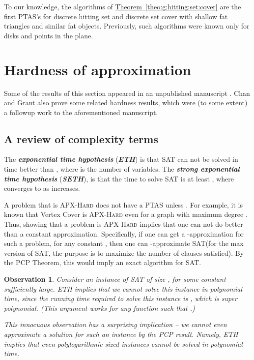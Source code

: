 \documentclass[12pt]{article}
\newcommand{\Term}[1]{\textsf{#1}}
\newcommand{\emphic}[2]{\textcolor{blue25}{\textbf{\emph{#1}}}\index{#2}}
\renewcommand{\emphic}[2]{\textbf{\emph{#1}}}
\newcommand{\emphi}[1]{\emphic{#1}{#1}}
\newtheorem{observation}[theorem]{Observation}
\theoremstyle{remark}\theoremheaderfont{\sf}\theorembodyfont{\upshape}
\numberwithin{figure}{section}\numberwithin{table}{section}\numberwithin{equation}{section}
\newcommand{\HLink}[2]{\hyperref[#2]{#1~\ref*{#2}}}
\newcommand{\HLinkPage}[2]{\hyperref[#2]{#1~\ref*{#2}}}
\newcommand{\seclab}[1]{\label{sec:#1}} \newcommand{\secref}[1]{\HLink{Section}{sec:#1}} \newcommand{\secrefpage}[1]{\HLinkPage{Section}{sec:#1}}
\newcommand{\obslab}[1]{\label{observation:#1}}
\newcommand{\thmref}[1]{\HLink{Theorem}{theo:#1}}
\newcommand{\ETH}{\Term{ETH}\xspace}
\newcommand{\SETH}{\Term{SETH}\xspace}
\newcommand{\TrSAT}{\ProblemC{SAT}\xspace}
\newcommand{\kSAT}{\ProblemC{SAT}\xspace}
\newcommand{\ProblemC}[1]{\textsf{#1}}
\providecommand{\ComplexityClass}[1]{{{\textcolor[named]{ColorComplexityClass}{\textsc{#1}}}}}
\newcommand{\PTAS}{\Term{PTAS}\xspace}
\newcommand{\APXHard}{\ComplexityClass{APX-Hard}\xspace}
\begin{document}
\begin{remark}
  To our knowledge, the algorithms of \thmref{g:hitting:set:cover} are
  the first \PTAS's for discrete hitting set and discrete set cover
  with shallow fat triangles and similar fat objects. Previously, such
  algorithms were known only for disks and points in the plane.
\end{remark}






\section{Hardness of approximation}
\seclab{hardness}

Some of the results of this section appeared in an unpublished
manuscript \cite{h-bffne-09}.  Chan and Grant \cite{cg-eaahr-14} also
prove some related hardness results, which were (to some extent) a
followup work to the aforementioned manuscript.

\subsection{A review of complexity terms} \seclab{complexity}


The \emphi{exponential time hypothesis} (\emphi{\ETH})
\cite{ip-ocks-01, ipz-wphse-01} is that \TrSAT can not be solved in
time better than , where  is the number of
variables. The \emphi{strong exponential time hypothesis}
(\emphi{\SETH}), is that the time to solve \kSAT is at least
, where  converges to  as  increases.

A problem that is \APXHard does not have a \PTAS unless
.  For example, it is known that \ProblemC{Vertex Cover}
is \APXHard even for a graph with maximum degree 
\cite{acgkm-ca-99}.  Thus, showing that a problem is \APXHard implies
that one can not do better than a constant
approximation. Specifically, if one can get a -approximation
for such a problem, for any constant , then one can
-approximate \TrSAT (for the max version of \TrSAT, the
purpose is to maximize the number of clauses satisfied). By the
\Term{PCP} Theorem, this would imply an exact algorithm for \TrSAT.


\begin{observation}\obslab{eth:no:a}Consider an instance of \TrSAT of size , for some
  constant  sufficiently large. \ETH implies that we cannot
  solve this instance in polynomial time, since the running time
  required to solve this instance is , which is super
  polynomial. (This argument works for any function  such that
  .)

  This innocuous observation has a surprising implication -- we cannot
  even  approximate a solution for such an instance by the
  \Term{PCP} result. Namely, \ETH implies that even polylogarithmic
  sized instances cannot be solved in polynomial time.
\end{observation}
\end{document}
